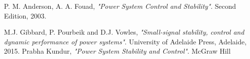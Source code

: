 \documentclass[Lau,noexaminfo]{sapthesis}
\begin{document}
	\begin{thebibliography}{9}
		P. M. Anderson, A. A. Fouad,
		\textit{"Power System Control and Stability"}.
		Second Edition, 2003.
		
			M.J. Gibbard, P. Pourbeik and D.J. Vowles,
			\textit{"Small-signal stability, control
				and dynamic performance of power systems"}.
			University of Adelaide Press,
			Adelaide, 2015.
		Prabha Kundur,
		\textit{"Power System Stability and Control"}. McGraw Hill
	\end{thebibliography}
	

	
	
	
	
	
	

	
\end{document}
